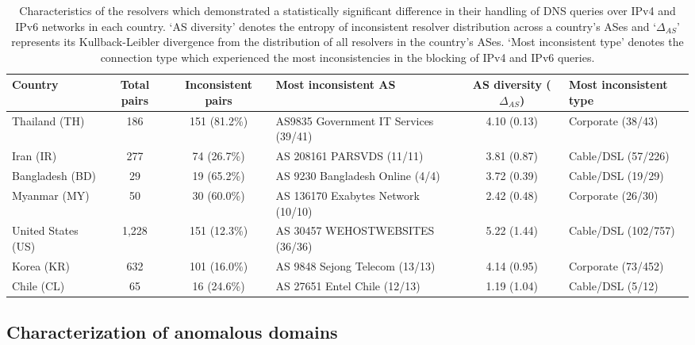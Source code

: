 \begin{table*}[t]
  \centering
  \small
  \scalebox{\tabularscale} {
    \begin{tabular}{lccp{2in}cp{1.5in}}
    \toprule
      {\bf Country} & 
      {\bf Total pairs} & {\bf Inconsistent pairs} & 
      {\bf Most inconsistent AS} & 
      {\bf AS diversity ($\Delta_{AS}$)} &
      {\bf Most inconsistent type} 
    \\ \midrule
      Thailand (TH)            & 186  & 151 (81.2\%)  &  AS9835 Government IT Services (39/41)  & 4.10 (0.13) & Corporate (38/43) \\
      Iran (IR)                & 277  & 74 (26.7\%) & AS 208161 PARSVDS (11/11) & 3.81 (0.87) & Cable/DSL (57/226) \\    
      Bangladesh (BD)          & 29   & 19 (65.2\%) & AS 9230 Bangladesh Online (4/4) & 3.72 (0.39) & Cable/DSL (19/29) \\    
      Myanmar (MY)             & 50   & 30 (60.0\%) & AS 136170 Exabytes Network (10/10) & 2.42 (0.48) & Corporate (26/30) \\    
      United States (US)       & 1,228& 151 (12.3\%) & AS 30457 WEHOSTWEBSITES (36/36) & 5.22 (1.44) & Cable/DSL (102/757) \\    
      \midrule  
      Korea (KR)               & 632  & 101 (16.0\%)   & AS 9848 Sejong Telecom (13/13) & 4.14 (0.95) & Corporate (73/452)   \\    
      Chile (CL)               & 65   & 16 (24.6\%) & AS 27651 Entel Chile (12/13) & 1.19 (1.04) & Cable/DSL (5/12) \\    

    \bottomrule
  \end{tabular}
  }
  \caption{Characteristics of the resolvers which demonstrated a statistically
  significant difference in their handling of DNS queries over IPv4 and IPv6
  networks in each country. `AS diversity' denotes the entropy of inconsistent
  resolver distribution across a country's ASes and `$\Delta_{AS}$' represents its
  Kullback-Leibler divergence from the distribution of all resolvers in the
  country's ASes. `Most inconsistent type' denotes the connection type which
  experienced the most inconsistencies in the blocking of IPv4 and IPv6
  queries.}
  \label{tab:resources:resolvers}
\end{table*}


\subsection{Characterization of anomalous domains}
\label{sec:infrastructure:domains}

